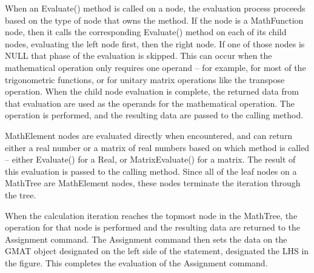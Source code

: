 When an Evaluate() method is called on a node, the evaluation process proceeds
based on the type of node that owns the method.  If the node is a MathFunction
node, then it calls the corresponding Evaluate() method on each of its child
nodes, evaluating the left node first, then the right node.  If one of those
nodes is NULL that phase of the evaluation is skipped.  This can occur when the
mathematical operation only requires one operand -- for example, for most of
the trigonometric functions, or for unitary matrix operations like the
transpose operation.  When the child node evaluation is complete, the returned
data from that evaluation are used as the operands for the mathematical
operation.  The operation is performed, and the resulting data are passed to
the calling method.

MathElement nodes are evaluated directly when encountered, and can return
either a real number or a matrix of real numbers based on which method is
called -- either Evaluate() for a Real, or MatrixEvaluate() for a matrix.  The
result of this evaluation is passed to the calling method.  Since all of the
leaf nodes on a MathTree are MathElement nodes, these nodes terminate the
iteration through the tree.

When the calculation iteration reaches the topmost node in the MathTree, the
operation for that node is performed and the resulting data are returned to the Assignment command. 
The Assignment command then sets the data on the GMAT
object designated on the left side of the statement, designated the LHS in the
figure.  This completes the evaluation of the Assignment command.
